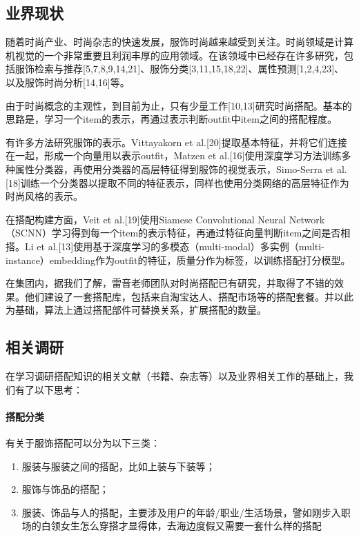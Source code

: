 \subsection{业界现状}
随着时尚产业、时尚杂志的快速发展，服饰时尚越来越受到关注。时尚领域是计算机视觉的一个非常重要且利润丰厚的应用领域。在该领域中已经存在许多研究，包括服饰检索与推荐[5,7,8,9,14,21]、服饰分类[3,11,15,18,22]、属性预测[1,2,4,23]、以及服饰时尚分析[14,16]等。

\par 由于时尚概念的主观性，到目前为止，只有少量工作[10,13]研究时尚搭配。基本的思路是，学习一个item的表示，再通过表示判断outfit中item之间的搭配程度。

\par 有许多方法研究服饰的表示。Vittayakorn et al.[20]提取基本特征，并将它们连接在一起，形成一个向量用以表示outfit，Matzen et al.[16]使用深度学习方法训练多种属性分类器，再使用分类器的高层特征得到服饰的视觉表示，Simo-Serra et al.[18]训练一个分类器以提取不同的特征表示，同样也使用分类网络的高层特征作为时尚风格的表示。

\par 在搭配构建方面，Veit et al.[19]使用Siamese Convolutional Neural Network （SCNN）学习得到每一个item的表示特征，再通过特征向量判断item之间是否相搭。Li et al.[13]使用基于深度学习的多模态（multi-modal）多实例（multi-instance）embedding作为outfit的特征，质量分作为标签，以训练搭配打分模型。

\par 在集团内，据我们了解，雷音老师团队对时尚搭配已有研究，并取得了不错的效果。他们建设了一套搭配库，包括来自淘宝达人、搭配市场等的搭配套餐。并以此为基础，算法上通过搭配部件可替换关系，扩展搭配的数量。

\subsection{相关调研}
在学习调研搭配知识的相关文献（书籍、杂志等）以及业界相关工作的基础上，我们有了以下思考：

\paragraph{搭配分类}
有关于服饰搭配可以分为以下三类：
\begin{enumerate}
\item 服装与服装之间的搭配，比如上装与下装等；
\item 服饰与饰品的搭配；
\item 服装、饰品与人的搭配，主要涉及用户的年龄/职业/生活场景，譬如刚步入职场的白领女生怎么穿搭才显得体，去海边度假又需要一套什么样的搭配
\end{enumerate}
